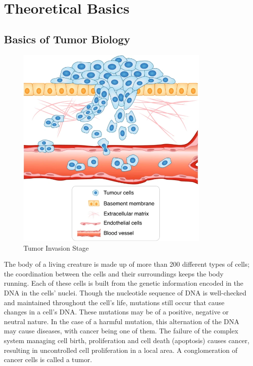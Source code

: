 \section{Theoretical Basics}
\label{sec:theoretical_basics}
\subsection{Basics of Tumor Biology}
\begin{figure}[h]
    \centering
    \includegraphics[width=0.85\textwidth]{resources/images/tumour_invasion_stage.png}
    \caption{Tumor Invasion Stage}
    \label{fig:tumor_invasion_stage}
\end{figure}

The body of a living creature is made up of more than 200 different types of cells; the coordination between the cells and their surroundings keeps the body running. Each of these cells is built from the genetic information encoded in the DNA in the cells' nuclei. Though the nucleotide sequence of DNA is well-checked and maintained throughout the cell's life, mutations still occur that cause changes in a cell's DNA. These mutations may be of a positive, negative or neutral nature. In the case of a harmful mutation, this alternation of the DNA may cause diseases, with cancer being one of them. The failure of the complex system managing cell birth, proliferation and cell death (apoptosis) causes cancer, resulting in uncontrolled cell proliferation in a local area. A conglomeration of cancer cells is called a tumor. 


